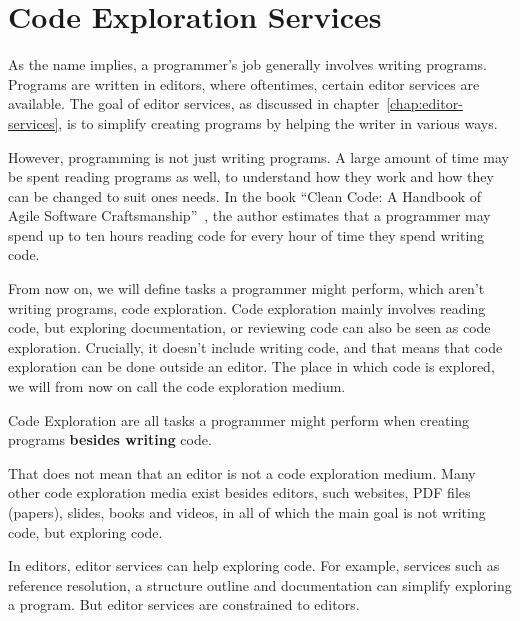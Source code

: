 
\chapter{Code Exploration Services}
\label{chap:code-exploration-services}


As the name implies, a programmer's job generally involves writing programs.
Programs are written in editors, where oftentimes, certain editor services are available.
The goal of editor services, as discussed in chapter~\ref{chap:editor-services}, is to simplify
creating programs by helping the writer in various ways. 

However, programming is not just writing programs.
A large amount of time may be spent reading programs as well, to understand how they work and how they can be changed to suit ones needs.
In the book ``Clean Code: A Handbook of Agile Software Craftsmanship''~\autocite{martin_reading_code_ratio},
the author estimates that a programmer may spend up to ten hours reading code for every hour of time they spend writing code.

From now on, we will define tasks a programmer might perform, which aren't writing programs, code exploration.
Code exploration mainly involves reading code, but exploring documentation, or reviewing code can also be seen as code exploration.
Crucially, it doesn't include writing code, and that means that code exploration can be done outside an editor.
The place in which code is explored, we will from now on call the code exploration medium.

\begin{definition}
    Code Exploration are all tasks a programmer might perform when creating programs \textbf{besides writing} code.
\end{definition}

That does not mean that an editor is not a code exploration medium.
Many other code exploration media exist besides editors, such websites, PDF files (papers), slides, books and videos, in
all of which the main goal is not writing code, but exploring code.

In editors, editor services can help exploring code.
For example, services such as reference resolution, a structure outline and documentation can simplify exploring a program. 
But editor services are constrained to editors.

